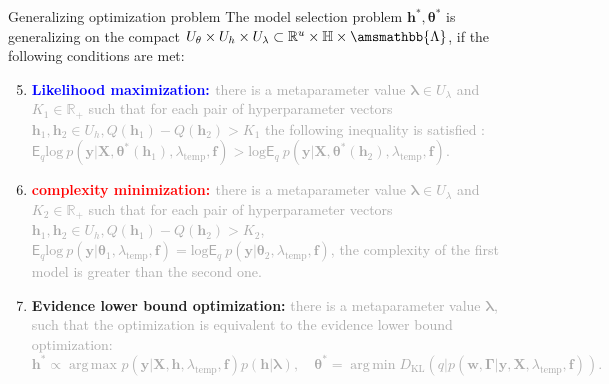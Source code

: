 \documentclass[usenames,dvipsnames,11pt,pdf,utf8,russian,aspectratio=43]{beamer}
\DeclareMathOperator*{\argmin}{arg\,min}
\DeclareMathOperator*{\argmax}{arg\,max}
\begin{document}
\begin{frame}{Generalizing optimization problem}
\footnotesize
The model selection problem  $\mathbf{h}^{*}, \boldsymbol{\theta}^{*}$ is generalizing on the compact $U_{\theta}\times U_{h} \times U_{\lambda} \subset \mathbb{R}^{u} \times \mathbb{H} \times \amsmathbb{\Lambda}$, if the following conditions are met:
\begin{enumerate}
\setcounter{enumi}{4}
\item \textbf{ \textcolor{blue}{Likelihood maximization: }}\textcolor{darkgray}{ there is a metaparameter value $\boldsymbol{\lambda} \in U_{\lambda}$ and  $K_1 \in \mathbb{R}_{+}$ such that for each pair of hyperparameter vectors $\mathbf{h}_1, \mathbf{h}_2 \in  U_{h}, Q(\mathbf{h}_1) - Q(\mathbf{h}_2) > K_1$ the following inequality is satisfied : $\mathsf{E}_q \text{log}~p(\mathbf{y}|\mathbf{X}, \boldsymbol{\theta}^{*}(\mathbf{h}_1), \lambda_{\text{temp}}, \mathbf{f})>\text{log}\mathsf{E}_q ~p(\mathbf{y}|\mathbf{X}, \boldsymbol{\theta}^{*}(\mathbf{h}_2), \lambda_{\text{temp}}, \mathbf{f})$.}

\item \textbf{\textcolor{red}{complexity minimization: }}\textcolor{darkgray}{ there is a metaparameter value  $\boldsymbol{\lambda} \in U_{\lambda}$ and $K_2 \in \mathbb{R}_{+}$ such that for each pair of hyperparameter vectors $\mathbf{h}_1, \mathbf{h}_2 \in U_h, Q(\mathbf{h}_1) - Q(\mathbf{h}_2) > K_2$,  $\mathsf{E}_q \text{log}~p(\mathbf{y}|\boldsymbol{\theta}_1, \lambda_{\text{temp}}, \mathbf{f}) = \text{log}\mathsf{E}_q ~p(\mathbf{y}|\boldsymbol{\theta}_2, \lambda_{\text{temp}}, \mathbf{f})$, the complexity of the first model is greater than the second one.}

\item \textbf{Evidence lower bound optimization: }\textcolor{darkgray}{ there is a metaparameter value  $\boldsymbol{\lambda}$, such that the optimization is equivalent to the evidence lower bound optimization:
\vspace{-0.2cm}
\[
    \mathbf{h}^{*} \propto \argmax_{} p(\mathbf{y}|\mathbf{X}, \mathbf{h}, \lambda_{\text{temp}}, \mathbf{f})p(\mathbf{h}|\boldsymbol{\lambda}),\quad
    \boldsymbol{\theta}^{*} = \argmin D_\text{KL}(q| p(\mathbf{w}, \boldsymbol{\Gamma}|\mathbf{y}, \mathbf{X}, \lambda_{\text{temp}}, \mathbf{f})).
\]}
\vspace{-0.6cm}
\end{enumerate}
\end{frame}
\end{document}

